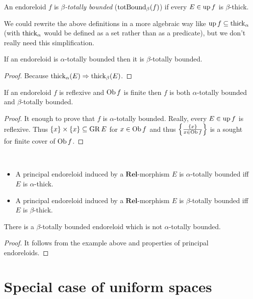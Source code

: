 \begin{defn}
An endoreloid $f$ is \emph{$\beta$-totally bounded} ($\operatorname{totBound}_{\beta}(f)$)
if every $E\in\operatorname{up} f$ is $\beta$-thick.\end{defn}
\begin{rem}
We could rewrite the above definitions in a more algebraic way like
$\operatorname{up} f\subseteq\operatorname{thick}_{\alpha}$ (with $\operatorname{thick}_{\alpha}$ would be
defined as a set rather than as a predicate), but we don't really
need this simplification.\end{rem}
\begin{prop}
If an endoreloid is $\alpha$-totally bounded then it is $\beta$-totally
bounded.\end{prop}
\begin{proof}
Because $\operatorname{thick}_{\alpha}(E)\Rightarrow\operatorname{thick}_{\beta}(E)$.\end{proof}
\begin{prop}
If an endoreloid $f$ is reflexive and $\operatorname{Ob} f$ is finite then $f$
is both $\alpha$-totally bounded and $\beta$-totally bounded.\end{prop}
\begin{proof}
It enough to prove that $f$ is $\alpha$-totally bounded. Really,
every $E\in\operatorname{up} f$ is reflexive. Thus $\{x\}\times\{x\}\subseteq\operatorname{GR} E$
for $x\in\operatorname{Ob} f$ and thus $\left\{ \frac{\{x\}}{x\in\operatorname{Ob} f}\right\}$ is a sought
for finite cover of $\operatorname{Ob} f$.\end{proof}
\begin{obvious}
~
\begin{itemize}
\item A principal endoreloid induced by a $\mathbf{Rel}$-morphism $E$ is
$\alpha$-totally bounded iff $E$ is $\alpha$-thick.
\item A principal endoreloid induced by a $\mathbf{Rel}$-morphism $E$ is
$\beta$-totally bounded iff $E$ is $\beta$-thick.
\end{itemize}
\end{obvious}
\begin{example}
There is a $\beta$-totally bounded endoreloid which is not $\alpha$-totally
bounded.\end{example}
\begin{proof}
It follows from the example above and properties of principal endoreloids.
\end{proof}

\section{Special case of uniform spaces}

